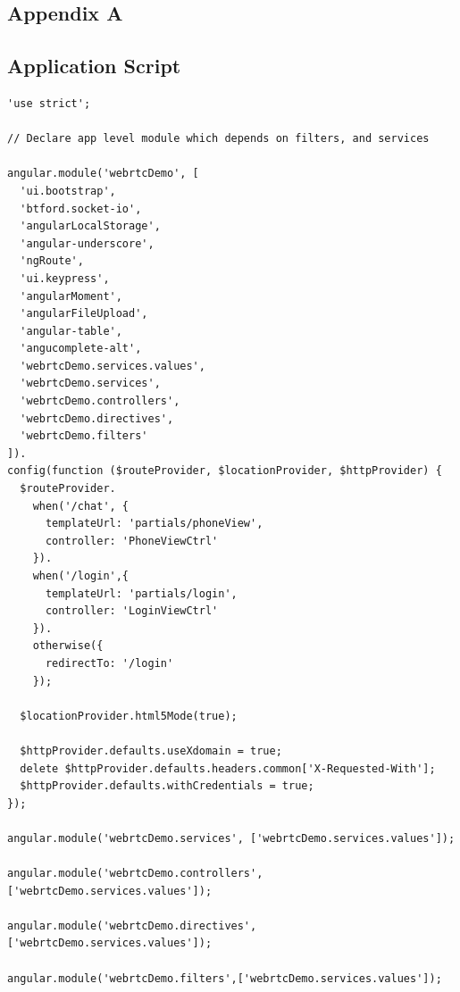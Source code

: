 \appendix
{}
 \renewcommand{\chaptername}{\appendixname}
 
\begin{appendices}

\chapter{Appendix A}

\section{Application Script} \label{app:app_js}
\begin{lstlisting}[caption={app.js in application client},label={code:app_js}]
'use strict';

// Declare app level module which depends on filters, and services

angular.module('webrtcDemo', [
  'ui.bootstrap',
  'btford.socket-io',
  'angularLocalStorage',
  'angular-underscore',
  'ngRoute',
  'ui.keypress',
  'angularMoment',
  'angularFileUpload',
  'angular-table',
  'angucomplete-alt',
  'webrtcDemo.services.values',
  'webrtcDemo.services',
  'webrtcDemo.controllers',
  'webrtcDemo.directives',
  'webrtcDemo.filters'
]).
config(function ($routeProvider, $locationProvider, $httpProvider) {
  $routeProvider.
    when('/chat', {
      templateUrl: 'partials/phoneView',
      controller: 'PhoneViewCtrl'
    }).
    when('/login',{
      templateUrl: 'partials/login',
      controller: 'LoginViewCtrl'
    }).
    otherwise({
      redirectTo: '/login'
    });

  $locationProvider.html5Mode(true);

  $httpProvider.defaults.useXdomain = true;
  delete $httpProvider.defaults.headers.common['X-Requested-With'];
  $httpProvider.defaults.withCredentials = true;
});

angular.module('webrtcDemo.services', ['webrtcDemo.services.values']);

angular.module('webrtcDemo.controllers',['webrtcDemo.services.values']);

angular.module('webrtcDemo.directives',['webrtcDemo.services.values']);

angular.module('webrtcDemo.filters',['webrtcDemo.services.values']);
\end{lstlisting}


\end{appendices}
